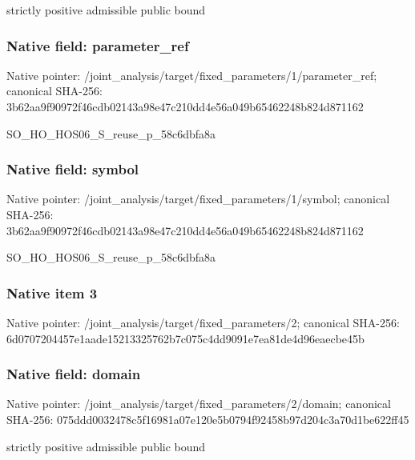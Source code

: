 \documentclass[10pt,a4paper]{article}
\begin{document}
\begingroup\raggedright\sloppy strictly positive admissible public bound\par\endgroup

\subsubsection{Native field: parameter\_\allowbreak{}ref}
Native pointer: /joint\_\allowbreak{}analysis/target/fixed\_\allowbreak{}parameters/1/parameter\_\allowbreak{}ref; canonical SHA-256: 3b62aa9f90972f46cdb02143a98e47c210dd4e56a049b65462248b824d871162

\begingroup\raggedright\sloppy SO\_\allowbreak{}HO\_\allowbreak{}HOS06\_\allowbreak{}S\_\allowbreak{}reuse\_\allowbreak{}p\_\allowbreak{}58c6dbfa8a\par\endgroup

\subsubsection{Native field: symbol}
Native pointer: /joint\_\allowbreak{}analysis/target/fixed\_\allowbreak{}parameters/1/symbol; canonical SHA-256: 3b62aa9f90972f46cdb02143a98e47c210dd4e56a049b65462248b824d871162

\begingroup\raggedright\sloppy SO\_\allowbreak{}HO\_\allowbreak{}HOS06\_\allowbreak{}S\_\allowbreak{}reuse\_\allowbreak{}p\_\allowbreak{}58c6dbfa8a\par\endgroup

\subsubsection{Native item 3}
Native pointer: /joint\_\allowbreak{}analysis/target/fixed\_\allowbreak{}parameters/2; canonical SHA-256: 6d0707204457e1aade15213325762b7c075c4dd9091e7ea81de4d96eaecbe45b

\subsubsection{Native field: domain}
Native pointer: /joint\_\allowbreak{}analysis/target/fixed\_\allowbreak{}parameters/2/domain; canonical SHA-256: 075ddd0032478c5f16981a07e120e5b0794f92458b97d204c3a70d1be622ff45

\begingroup\raggedright\sloppy strictly positive admissible public bound\par\endgroup
\end{document}
